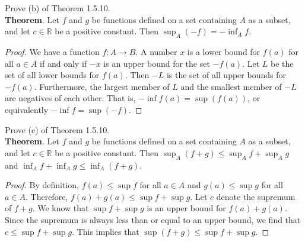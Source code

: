\documentclass[12pt]{article}
\newenvironment{exercise}[2][Exercise]{\begin{trivlist}
\item[\hskip \labelsep {\bfseries #1}\hskip \labelsep {\bfseries #2.}]}{\end{trivlist}}
\begin{document}
\begin{exercise}{1.5.11}
Prove (b) of Theorem 1.5.10. \\

\textbf{Theorem}. Let $f$ and $g$ be functions defined on a set containing $A$ as a subset, and let $c \in \mathbb{R}$ be a positive constant. Then $\sup_A (-f) = - \inf_A f$.

	\begin{proof}
	We have a function $f: A \to B$. A number $x$ is a lower bound for $f(a)$ for all $a \in A$ if and only if $-x$ is an upper bound for the set $-f(a)$. Let  $L$ be the set of all lower bounds for $f(a)$. Then $-L$ is the set of all upper bounds for $-f(a)$. Furthermore, the largest member of $L$ and the smallest member of $-L$ are negatives of each other. That is, $- \inf f(a) = \sup (f(a))$, or equivalently $- \inf f = \sup (-f)$.  
	\end{proof}
\end{exercise}

\begin{exercise}{1.5.12}
Prove (c) of Theorem 1.5.10.\\

\textbf{Theorem}. Let $f$ and $g$ be functions defined on a set containing $A$ as a subset, and let $c \in \mathbb{R}$ be a positive constant. Then $\sup_A (f+g) \leq \sup_A f + \sup_A g $ and $\inf_A f + \inf_A g \leq \inf_A (f+g)$.

	\begin{proof}
	By definition, $f(a) \leq \sup f$ for all $a \in A$ and $g(a) \leq \sup g$ for all $a \in A$. Therefore, $f(a)+g(a) \leq \sup f + \sup g$. Let $c$ denote the supremum of $f+g$. We know that $\sup f + \sup g$ is an upper bound  for $f(a)+g(a)$. Since the supremum is always less than or equal to an upper bound, we find that $c \leq \sup f + \sup g$. This implies that $\sup (f+g) \leq \sup f + \sup g$.
	\end{proof}
\end{exercise}
\end{document}
